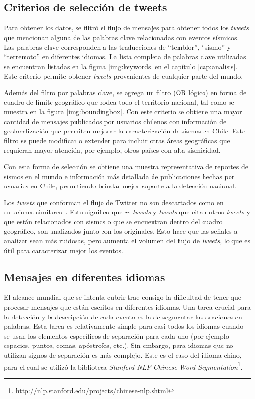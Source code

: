 \subsection{Criterios de selección de tweets}

Para obtener los datos, se filtró el flujo de mensajes para obtener todos los \textit{tweets} que mencionan alguna de las palabras clave relacionadas con eventos sísmicos. 
%
Las palabras clave corresponden a las traducciones de ``temblor'', ``sismo'' y ``terremoto'' en diferentes idiomas. 
%
La lista completa de palabras clave utilizadas se encuentran listadas en la figura \ref{img:keywords} en el capítulo \ref{cap:analisis}. 
%
Este criterio permite obtener \textit{tweets} provenientes de cualquier parte del mundo.

%
Además del filtro por palabras clave, se agrega un filtro (OR lógico) en forma de cuadro de límite geográfico que rodea todo el territorio nacional, tal como se muestra en la figura \ref{img:boundingbox}.
%
Con este criterio se obtiene una mayor cantidad de mensajes publicados por usuarios chilenos con información de geolocalización que permiten mejorar la caracterización de sismos en Chile.
%
Este filtro se puede modificar o extender para incluir otras áreas geográficas que requieran mayor atención, por ejemplo, otros países con alta sísmicidad. 


Con esta forma de selección se obtiene una muestra representativa de reportes de sismos en el mundo e información más detallada de publicaciones hechas por usuarios en Chile, permitiendo brindar mejor soporte a la detección nacional.


Los \textit{tweets} que conforman el flujo de Twitter no son descartados como en soluciones similares~\cite{avvenuti2014ears}. 
%
Esto significa que \textit{re-tweets} y \textit{tweets} que citan otros \textit{tweets} y que están relacionados con sismos o que se encuentran dentro del cuadro geográfico, son analizados junto con los originales. 
%
Esto hace que las señales a analizar sean más ruidosas, pero aumenta el volumen del flujo de \textit{tweets}, lo que es útil para caracterizar mejor los eventos. 

\subsection{Mensajes en diferentes idiomas}
El alcance mundial que se intenta cubrir trae consigo la dificultad de tener que procesar mensajes que están escritos en diferentes idiomas. 
%
Una tarea crucial para la detección y la descripción de cada evento es la de segmentar las oraciones en palabras.
%
Esta tarea es relativamente simple para casi todos los idiomas cuando se usan los elementos específicos de separación para cada uno (por ejemplo: espacios, puntos, comas, apóstrofes, etc.).
% 
Sin embargo, para idiomas que no utilizan signos de separación es más complejo.
%
Este es el caso del idioma chino, para el cual se utilizó la biblioteca {\em Stanford NLP Chinese Word Segmentation}\footnote{\url{http://nlp.stanford.edu/projects/chinese-nlp.shtml}}.

